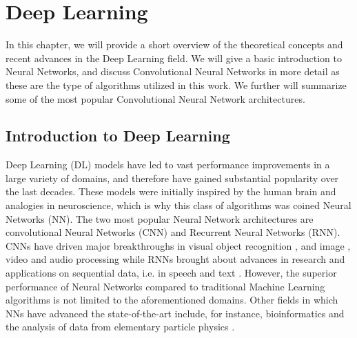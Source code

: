 
\chapter{Deep Learning} %

\label{Chapter3} %


In this chapter, we will provide a short overview of the theoretical concepts and recent advances in the Deep Learning field. We will give a basic introduction to Neural Networks, and discuss Convolutional Neural Networks in more detail as these are the type of algorithms utilized in this work. We further will summarize some of the most popular Convolutional Neural Network architectures.

\section{Introduction to Deep Learning}

Deep Learning (DL) models have led to vast performance improvements in a large variety of domains, and therefore have gained substantial popularity over the last decades. These models were initially inspired by the human brain and analogies in neuroscience, which is why this class of algorithms was coined Neural Networks (NN). The two most popular Neural Network architectures are convolutional Neural Networks (CNN) and Recurrent Neural Networks (RNN). CNNs have driven major breakthroughs in visual object recognition \parencite{krizhevsky2012}, and image \parencite{zhang2015}, video \parencite{tompson2014} and audio \parencite{hinton2012} processing while RNNs brought about advances in research and applications on sequential data, i.e. in speech and text \parencite{collobert2011}. However, the superior performance of Neural Networks compared to traditional Machine Learning algorithms is not limited to the aforementioned domains. Other fields in which NNs have advanced the state-of-the-art include, for instance, bioinformatics \parencite{junshui2015} and the analysis of data from elementary particle physics \parencite{ciodaroc2012}.

